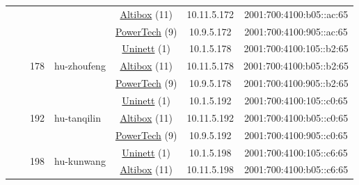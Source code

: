 \begin{small}
\begin{center}
\begin{longtable}{|c|c|c|c|c|c|c|c|}
  &  &  &  & \multicolumn{2}{|c|}{\tiny{\href{https://www.altibox.no}{Altibox} (11)}} & \tiny{10.11.5.172} & \tiny{2001:700:4100:b05::ac:65} \\* \cline{5-5}\cline{6-6}\cline{7-7}\cline{8-8}
  &  &  &  & \multicolumn{2}{|c|}{\tiny{\href{http://www.powertech.no}{PowerTech} (9)}} & \tiny{10.9.5.172} & \tiny{2001:700:4100:905::ac:65} \\* \cline{3-3}\cline{4-4}\cline{5-5}\cline{6-6}\cline{7-7}\cline{8-8}
  &  & \multirow{3}{*}{\tiny{178}} & \multicolumn{1}{|l|}{\multirow{3}{*}{\tiny{hu-zhoufeng}}} & \multicolumn{2}{|c|}{\tiny{\href{https://www.uninett.no}{Uninett} (1)}} & \tiny{10.1.5.178} & \tiny{2001:700:4100:105::b2:65} \\* \cline{5-5}\cline{6-6}\cline{7-7}\cline{8-8}
  &  &  &  & \multicolumn{2}{|c|}{\tiny{\href{https://www.altibox.no}{Altibox} (11)}} & \tiny{10.11.5.178} & \tiny{2001:700:4100:b05::b2:65} \\* \cline{5-5}\cline{6-6}\cline{7-7}\cline{8-8}
  &  &  &  & \multicolumn{2}{|c|}{\tiny{\href{http://www.powertech.no}{PowerTech} (9)}} & \tiny{10.9.5.178} & \tiny{2001:700:4100:905::b2:65} \\* \cline{3-3}\cline{4-4}\cline{5-5}\cline{6-6}\cline{7-7}\cline{8-8}
  &  & \multirow{3}{*}{\tiny{192}} & \multicolumn{1}{|l|}{\multirow{3}{*}{\tiny{hu-tanqilin}}} & \multicolumn{2}{|c|}{\tiny{\href{https://www.uninett.no}{Uninett} (1)}} & \tiny{10.1.5.192} & \tiny{2001:700:4100:105::c0:65} \\* \cline{5-5}\cline{6-6}\cline{7-7}\cline{8-8}
  &  &  &  & \multicolumn{2}{|c|}{\tiny{\href{https://www.altibox.no}{Altibox} (11)}} & \tiny{10.11.5.192} & \tiny{2001:700:4100:b05::c0:65} \\* \cline{5-5}\cline{6-6}\cline{7-7}\cline{8-8}
  &  &  &  & \multicolumn{2}{|c|}{\tiny{\href{http://www.powertech.no}{PowerTech} (9)}} & \tiny{10.9.5.192} & \tiny{2001:700:4100:905::c0:65} \\* \cline{3-3}\cline{4-4}\cline{5-5}\cline{6-6}\cline{7-7}\cline{8-8}
  &  & \multirow{3}{*}{\tiny{198}} & \multicolumn{1}{|l|}{\multirow{3}{*}{\tiny{hu-kunwang}}} & \multicolumn{2}{|c|}{\tiny{\href{https://www.uninett.no}{Uninett} (1)}} & \tiny{10.1.5.198} & \tiny{2001:700:4100:105::c6:65} \\* \cline{5-5}\cline{6-6}\cline{7-7}\cline{8-8}
  &  &  &  & \multicolumn{2}{|c|}{\tiny{\href{https://www.altibox.no}{Altibox} (11)}} & \tiny{10.11.5.198} & \tiny{2001:700:4100:b05::c6:65} \\* \cline{5-5}\cline{6-6}\cline{7-7}\cline{8-8}

\end{longtable}
\end{center}
\end{small}
